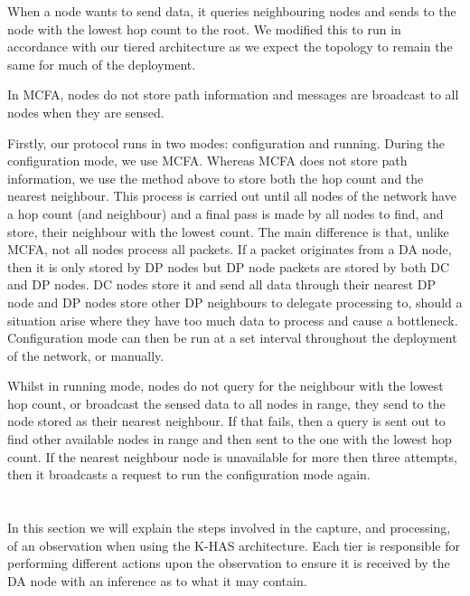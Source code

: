 		When a node wants to send data, it queries neighbouring nodes and sends to the node with the lowest hop count to the root. We modified this to run in accordance with our tiered architecture as we expect the topology to remain the same for much of the deployment.

		In MCFA, nodes do not store path information and messages are broadcast to all nodes when they are sensed.

		Firstly, our protocol runs in two modes: configuration and running. During the configuration mode, we use MCFA. Whereas MCFA does not store path information, we use the method \DIFdelbegin {}\DIFdelend \DIFaddbegin {}\DIFaddend above to store both the hop count and the nearest neighbour. This process is carried out until all nodes of the network have a hop count (and neighbour) and a final pass is made by all nodes to find, and store, their neighbour with the lowest count. The main difference is that, unlike MCFA, not all nodes process all packets. If a packet originates from a DA node, then it is only stored by DP nodes but DP node packets are stored by both DC and DP nodes. DC nodes store it and send all data through their nearest DP node and DP nodes store other DP neighbours to delegate processing to, should a situation arise where they have too much data to process and cause a bottleneck. Configuration mode can then be run at a set interval throughout the deployment of the network, or \DIFdelbegin {}\DIFdelend \DIFaddbegin {}\DIFaddend manually.

		Whilst in running mode, nodes do not query for the neighbour with the lowest hop count, or broadcast the sensed data to all nodes in range, they send to the node stored as their nearest neighbour. If that fails, then a query is sent out to find other available nodes in range and then sent to the one with the lowest hop count. If the nearest neighbour node is unavailable for more then three attempts, then it broadcasts a request to run the configuration mode again.

	
	\section{\DIFdelbegin {}\DIFdelend \DIFaddbegin {}\DIFaddend }\label{arch:walk}
		In this section we will explain the steps involved in the capture, and processing, of an observation when using the K-HAS architecture. Each tier is responsible for performing different actions upon the observation to ensure it is received by the DA node with an inference as to what it may contain.

